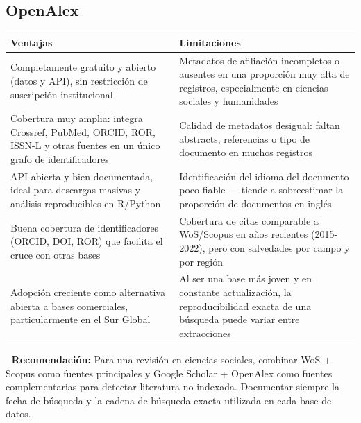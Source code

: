 \documentclass[
]{book}
\newcounter{none} %
\begin{document}
\subsection{OpenAlex}\label{openalex}

{\def\LTcaptype{none} %
\begin{longtable}[]{@{}
  >{\raggedright\arraybackslash}p{}
  >{\raggedright\arraybackslash}p{}@{}}
\toprule\noalign{}
\begin{minipage}[b]{\linewidth}\raggedright
Ventajas
\end{minipage} & \begin{minipage}[b]{\linewidth}\raggedright
Limitaciones
\end{minipage} \\
\midrule\noalign{}
\endhead
\bottomrule\noalign{}
\endlastfoot
Completamente gratuito y abierto (datos y API), sin restricción de suscripción institucional & Metadatos de afiliación incompletos o ausentes en una proporción muy alta de registros, especialmente en ciencias sociales y humanidades \\
Cobertura muy amplia: integra Crossref, PubMed, ORCID, ROR, ISSN-L y otras fuentes en un único grafo de identificadores & Calidad de metadatos desigual: faltan abstracts, referencias o tipo de documento en muchos registros \\
API abierta y bien documentada, ideal para descargas masivas y análisis reproducibles en R/Python & Identificación del idioma del documento poco fiable --- tiende a sobreestimar la proporción de documentos en inglés \\
Buena cobertura de identificadores (ORCID, DOI, ROR) que facilita el cruce con otras bases & Cobertura de citas comparable a WoS/Scopus en años recientes (2015-2022), pero con salvedades por campo y por región \\
Adopción creciente como alternativa abierta a bases comerciales, particularmente en el Sur Global & Al ser una base más joven y en constante actualización, la reproducibilidad exacta de una búsqueda puede variar entre extracciones \\
\end{longtable}
}

👣 \textbf{Recomendación:} Para una revisión en ciencias sociales, combinar WoS + Scopus como fuentes principales y Google Scholar + OpenAlex como fuentes complementarias para detectar literatura no indexada. Documentar siempre la fecha de búsqueda y la cadena de búsqueda exacta utilizada en cada base de datos.
\end{document}
